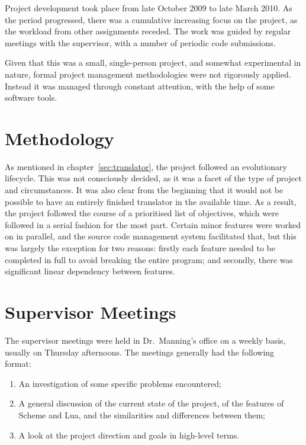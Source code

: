 Project development took place from late October 2009 to late March 2010. As the
period progressed, there was a cumulative increasing focus on the project, as
the workload from other assignments receded. The work was guided by regular
meetings with the supervisor, with a number of periodic code submissions.

Given that this was a small, single-person project, and somewhat experimental in
nature, formal project management methodologies were not rigorously applied.
Instead it was managed through constant attention, with the help of some
software tools.


\section{Methodology}

As mentioned in chapter~\ref{sec:translator}, the project followed an
evolutionary lifecycle. This was not consciously decided, as it was a facet of
the type of project and circumstances. It was also clear from the beginning that
it would not be possible to have an entirely finished translator in the
available time.  As a result, the project followed the course of a prioritised
list of objectives, which were followed in a serial fashion for the most part.
Certain minor features were worked on in parallel, and the source code
management system facilitated that, but this was largely the exception for two
reasons: firstly each feature needed to be completed in full to avoid breaking
the entire program; and secondly, there was significant linear dependency
between features.


\section{Supervisor Meetings}

The supervisor meetings were held in Dr.\ Manning's office on a weekly basis,
usually on Thursday afternoons. The meetings generally had the following format:

\begin{enumerate}
\item An investigation of some specific problems encountered;
\item A general discussion of the current state of the project, of the
features of Scheme and Lua, and the similarities and differences between
them;
\item A look at the project direction and goals in high-level terms.
\end{enumerate}

